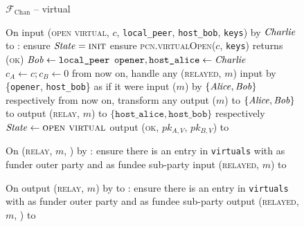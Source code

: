 \begin{figure}[H]
  \begin{systembox}{$\mathcal{F}_{\mathrm{Chan}}$ -- virtual}
    \begin{algorithmic}[1]
      \State On input (\textsc{open virtual}, $c$, \texttt{local\_peer},
      \texttt{host\_bob}, \texttt{keys}) by $\mathit{Charlie}$ to \alice:
      \label{code:functionality:chan:skeleton:virtual:fund-you}
      \Indent
        \State ensure $\mathit{State} = \textsc{init}$
        \State ensure \textsc{pcn.virtualOpen}($c$, \texttt{keys}) returns
        (\textsc{ok})
        \label{code:functionality:chan:skeleton:virtual:ln}
        \State $\mathit{Bob} \gets \texttt{local\_peer}$
        \State $\mathtt{opener}, \texttt{host\_alice} \gets \mathit{Charlie}$
        \State $c_A \gets c; c_B \gets 0$
        \State from now on, handle any (\textsc{relayed}, $m$) input by
        \{\texttt{opener}, \texttt{host\_bob}\} as if it were input ($m$) by
        $\{\mathit{Alice}, \mathit{Bob}\}$ respectively
        \State from now on, transform any output ($m$) to $\{\mathit{Alice}, \mathit{Bob}\}$ to
        output (\textsc{relay}, $m$) to $\{\texttt{host\_alice},
        \texttt{host\_bob}\}$ respectively
        \State $\mathit{State} \gets \textsc{open virtual}$
        \State output (\textsc{ok}, $pk_{A, V}$, $pk_{B, V}$) to \charlie
      \EndIndent
      \Statex

      \State On (\textsc{relay}, $m$, \charlie) by \alice:
      \Indent
        \State ensure there is an entry in \texttt{virtuals} with \alice as funder
        outer party and \charlie as fundee sub-party
        \label{code:functionality:chan:skeleton:virtual:relay:input:start}
        \State input (\textsc{relayed}, $m$) to \charlie
        \label{code:functionality:chan:skeleton:virtual:relay:input:end}
      \EndIndent
      \Statex

      \State On output (\textsc{relay}, $m$) by \charlie to \alice:
      \Indent
        \State ensure there is an entry in \texttt{virtuals} with \alice as funder
        outer party and \charlie as fundee sub-party 
        \label{code:functionality:chan:skeleton:virtual:relay:output:start}
        \State output (\textsc{relayed}, $m$, \charlie) to \environment
        \label{code:functionality:chan:skeleton:virtual:relay:output:end}
      \EndIndent
    \end{algorithmic}
  \end{systembox}
  \caption{}
  \label{code:functionality:chan:skeleton:virtual}
\end{figure}

